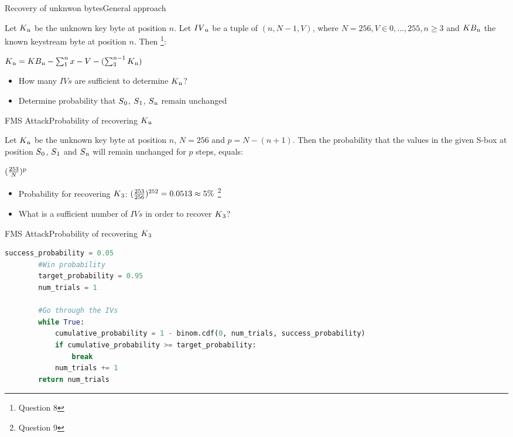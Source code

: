 \documentclass[
	aspectratio=169,	%
	onlytextwidth,		%
	t					%
	]{beamer}
\begin{document}
\begin{frame}[fragile]{Recovery of unknwon bytes}{General approach} 
	\begin{definition}
		Let $K\textsubscript{n} $ be the unknown key byte at position $n$. Let $ IV\textsubscript{n} $ be a tuple of $ (n, N-1, V) $,
		where $ N = 256, V \in {{0,\dots,255}}, n \geq 3 $ and $ KB\textsubscript{n} $ the known keystream byte at position $n$. Then \footnote[frame]{\footnotesize Question 8}: \\
		\begin{center}
			$K\textsubscript{n} = KB\textsubscript{n} - \sum_{1}^{n}x - V - (\sum_{3}^{n-1}K\textsubscript{n})$
		\end{center}
	\end{definition} 
	\begin{itemize}
		\item How many $IVs$ are sufficient to determine $ K\textsubscript{n} $?
		\item Determine probability that $ S\textsubscript{0}$, $S\textsubscript{1}$, $S\textsubscript{n} $ remain unchanged
	\end{itemize}
\end{frame}

\begin{frame}[fragile]{FMS Attack}{Probability of recovering $K\textsubscript{n}$}
	\begin{definition}
		Let $K\textsubscript{n}$ be the unknown key byte at position $n$, $N=256$ and $p = N-(n+1)$. Then the probability that the values in the given S-box at position $S\textsubscript{0}$,
		$S\textsubscript{1}$ and $S\textsubscript{n}$ will remain unchanged for $p$ steps, equals:\\
		\begin{center}
			$(\frac{253}{N})\textsuperscript{p}$
		\end{center}
	\end{definition} 
	\begin{itemize}
		\item Probability for recovering $K\textsubscript{3}$: $(\frac{253}{256})\textsuperscript{252} = 0.0513 \approx 5\%$ \footnote[frame]{\footnotesize Question 9}
		\item What is a sufficient number of $IVs$ in order to recover $K\textsubscript{3}$?
	\end{itemize}
\end{frame}

\begin{frame}[fragile]{FMS Attack}{Probability of recovering $K\textsubscript{3}$}
	\begin{lstlisting}[language=Python]
		success_probability = 0.05
		#Win probability
		target_probability = 0.95
		num_trials = 1

		#Go through the IVs
		while True:
			cumulative_probability = 1 - binom.cdf(0, num_trials, success_probability)
			if cumulative_probability >= target_probability:
				break
			num_trials += 1
		return num_trials
	\end{lstlisting}
\end{frame}
\end{document}
